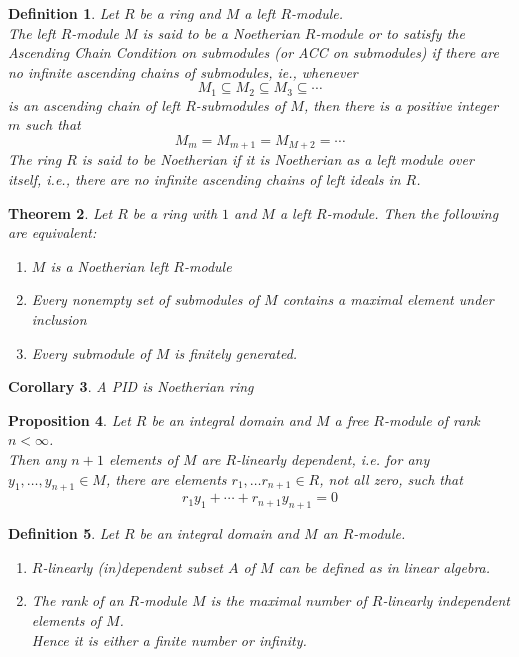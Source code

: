 \documentclass[a4paper,8pt]{article}
\newcommand{\hlt}[1]{\textit{{\color{blue}#1}}}
\theoremstyle{theorem}
\newtheorem{theorem}{Theorem}[subsection]
\newtheorem{corollary}[theorem]{Corollary}
\newtheorem{proposition}[theorem]{Proposition}
\newtheorem{definition}[theorem]{Definition}
\begin{document}
\begin{definition}
Let $R$ be a ring and $M$ a left $R$-module. \\
The left $R$-module $M$ is said to be a \hlt{Noetherian} $R$-module or to satisfy the Ascending Chain Condition on submodules (or \hlt{ACC} on submodules) if there are no infinite ascending chains of submodules, ie., whenever
\begin{equation}
M_1 \subseteq M_2 \subseteq M_3 \subseteq \cdots \nonumber
\end{equation}
is an ascending chain of left $R$-submodules of $M$, then there is a positive integer $m$ such that
\begin{equation}
M_m = M_{m+1} = M_{M+2} = \cdots \nonumber
\end{equation}
The ring $R$ is said to be \hlt{Noetherian} if it is Noetherian as a left module over itself, i.e., there are no infinite ascending chains of left ideals in $R$.
\end{definition}

\begin{theorem}
Let $R$ be a ring with $1$ and $M$ a left $R$-module. Then the following are equivalent:
\begin{enumerate}[label=(\roman*)]
\item $M$ is a Noetherian left $R$-module
\item Every nonempty set of submodules of $M$ contains a maximal element under inclusion
\item Every submodule of $M$ is finitely generated.
\end{enumerate}
\end{theorem}

\begin{corollary}
A PID is Noetherian ring
\end{corollary}

\begin{proposition}
Let $R$ be an integral domain and $M$ a free $R$-module of rank $n < \infty$. \\
Then any $n+1$ elements of $M$ are $R$-linearly dependent, i.e. for any $y_1, \ldots, y_{n+1} \in M$, there are elements $r_1, \ldots r_{n+1} \in R$, not all zero, such that
\begin{equation}
r_1 y_1 + \cdots + r_{n+1} y_{n+1} = 0 \nonumber
\end{equation}
\end{proposition}

\begin{definition}
Let $R$ be an integral domain and $M$ an $R$-module.
\begin{enumerate}[label=(\roman*)]
\item \hlt{$R$-linearly (in)dependent} subset $A$ of $M$ can be defined as in linear algebra.
\item The \hlt{rank} of an $R$-module $M$ is the maximal number of $R$-linearly independent elements of $M$.\\
Hence it is either a finite number or infinity.
\end{enumerate}
\end{definition}
\end{document}
